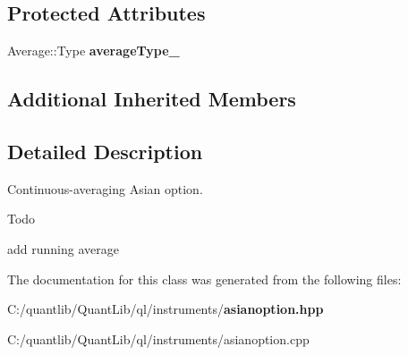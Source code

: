 \subsection*{Protected Attributes}
\begin{DoxyCompactItemize}
\item 
Average\+::\+Type {\bfseries average\+Type\+\_\+}\label{class_quant_lib_1_1_continuous_averaging_asian_option_a79edd4377cded2b3e68caddf37414f9e}

\end{DoxyCompactItemize}
\subsection*{Additional Inherited Members}


\subsection{Detailed Description}
Continuous-\/averaging Asian option. 

\begin{DoxyRefDesc}{Todo}
\item[{\bf Todo}]add running average\end{DoxyRefDesc}


The documentation for this class was generated from the following files\+:\begin{DoxyCompactItemize}
\item 
C\+:/quantlib/\+Quant\+Lib/ql/instruments/{\bf asianoption.\+hpp}\item 
C\+:/quantlib/\+Quant\+Lib/ql/instruments/asianoption.\+cpp\end{DoxyCompactItemize}
